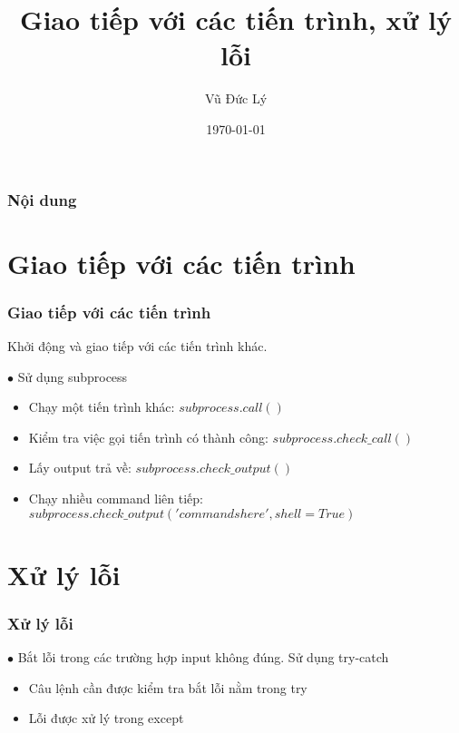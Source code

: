 \documentclass{beamer}
\title[Giao tiếp với các tiến trình, xử lý lỗi ]{Giao tiếp với các tiến trình, xử lý lỗi } %
\author{Vũ Đức Lý} %
\date{\today} %
\begin{document}
\begin{frame}
\titlepage %
\hyperlink{intro}{}
\end{frame}

\begin{frame}[label=intro]
\frametitle{Nội dung} %
\tableofcontents %
\end{frame}


\section{Giao tiếp với các tiến trình} 
\begin{frame}[label=subprocess]
\frametitle{Giao tiếp với các tiến trình}
Khởi động và giao tiếp với các tiến trình khác. 

$\bullet$ Sử dụng subprocess
\begin{itemize}
\item Chạy một tiến trình khác: $subprocess.call()$
\item Kiểm tra việc gọi tiến trình có thành công: $subprocess.check\_call()$
\item Lấy output trả về: $subprocess.check\_output()$
\item Chạy nhiều command liên tiếp: $subprocess.check\_output('commands here', shell = True)$
\end{itemize} 
\hyperlink{intro}{}
\hyperlink{moitruong}{}
\end{frame}

\section{Xử lý lỗi}
\begin{frame}[label=error]
\frametitle{Xử lý lỗi}
$\bullet$ Bắt lỗi trong các trường hợp input không đúng. Sử dụng try-catch
\begin{itemize}
\item Câu lệnh cần được kiểm tra bắt lỗi nằm trong try
\item Lỗi được xử lý trong except
\end{itemize}

\hyperlink{teptin}{}
\end{frame}
\end{document}
